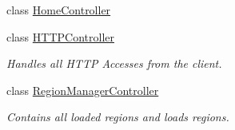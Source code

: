 \begin{DoxyCompactItemize}
class \hyperlink{classServer_1_1Controllers_1_1HomeController}{Home\-Controller}
\item 
class \hyperlink{classServer_1_1Controllers_1_1HTTPController}{H\-T\-T\-P\-Controller}
\begin{DoxyCompactList}\small\item\em Handles all H\-T\-T\-P Accesses from the client. \end{DoxyCompactList}\item 
class \hyperlink{classServer_1_1Controllers_1_1RegionManagerController}{Region\-Manager\-Controller}
\begin{DoxyCompactList}\small\item\em Contains all loaded regions and loads regions. \end{DoxyCompactList}\end{DoxyCompactItemize}
